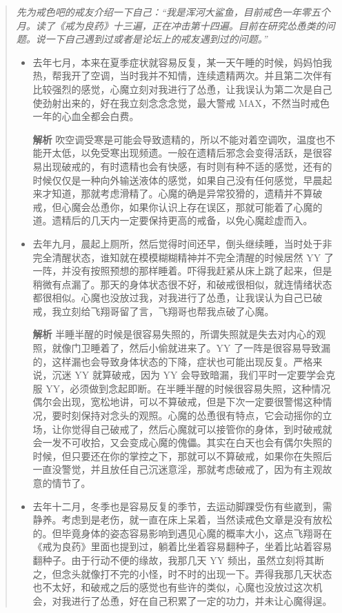 \begin{quotation}\it
    先为戒色吧的戒友介绍一下自己：“我是浑河大鲨鱼，目前戒色一年零五个月。读了《戒为良药》十三遍，正在冲击第十四遍。目前在研究怂恿类的问题。说一下自己遇到过或者是论坛上的戒友遇到过的问题。”

    \begin{itemize}
        \item 去年七月，本来在夏季症状就容易反复，某一天午睡的时候，妈妈怕我热，帮我开了空调，当时我并不知情，连续遗精两次。并且第二次伴有比较强烈的感觉，心魔立刻对我进行了怂恿，让我误认为第二次是自己使劲射出来的，好在我立刻念念念觉，最大警戒 MAX，不然当时戒色一年的心血全都会白费。

              \textbf{解析} 吹空调受寒是可能会导致遗精的，所以不能对着空调吹，温度也不能开太低，以免受寒出现频遗。一般在遗精后邪念会变得活跃，是很容易出现破戒的，有时遗精也会有快感，有时则有种不适的感觉，还有的时候仅仅是一种向外输送液体的感觉，如果自己没有任何感觉，早晨起来才知道，那就考虑滑精了。心魔的确是异常狡猾的，遗精并不算破戒，但心魔会怂恿你，如果你认识上存在误区，那就可能着了心魔的道。遗精后的几天内一定要保持更高的戒备，以免心魔趁虚而入。
        \item 去年九月，晨起上厕所，然后觉得时间还早，倒头继续睡，当时处于非完全清醒状态，谁知就在模模糊糊精神并不完全清醒的时候居然 YY 了一阵，并没有按照预想的那样睡着。吓得我赶紧从床上跳了起来，但是稍微有点漏了。那天的身体状态很不好，和破戒很相似，就连情绪状态都很相似。心魔也没放过我，对我进行了怂恿，让我误认为自己已破戒，我立刻给飞翔哥留了言，飞翔哥也帮我点破了心魔。

              \textbf{解析} 半睡半醒的时候是很容易失照的，所谓失照就是失去对内心的观照，就像门卫睡着了，然后小偷就进来了。YY 了一阵是很容易导致漏的，这样漏也会导致身体状态的下降，症状也可能出现反复。严格来说，沉迷 YY 就算破戒，因为 YY 会导致暗漏，我们平时一定要学会克服 YY，必须做到念起即断。在半睡半醒的时候很容易失照，这种情况偶尔会出现，宽松地讲，可以不算破戒，但是下次一定要很警惕这种情况，要时刻保持对念头的观照。心魔的怂恿很有特点，它会动摇你的立场，让你觉得自己破戒了，然后心魔就可以接管你的身体，到时破戒就会一发不可收拾，又会变成心魔的傀儡。其实在白天也会有偶尔失照的时候，但只要还在你的掌控之下，那就可以不算破戒，如果你在失照后一直没警觉，并且放任自己沉迷意淫，那就考虑破戒了，因为有主观故意的情节了。
        \item 去年十二月，冬季也是容易反复的季节，去运动脚踝受伤有些崴到，需静养。考虑到是老伤，就一直在床上呆着，当然读戒色文章是没有放松的。但毕竟身体的姿态容易影响到遇见心魔的概率大小，这点飞翔哥在《戒为良药》里面也提到过，躺着比坐着容易翻种子，坐着比站着容易翻种子。由于行动不便的缘故，我那几天 YY 频出，虽然立刻将其断之，但念头就像打不完的小怪，时不时的出现一下。弄得我那几天状态也不太好，和破戒之后的感觉也有些许的类似，心魔也没放过这次机会，对我进行了怂恿，好在自己积累了一定的功力，并未让心魔得逞。


\end{itemize}
\end{quotation}
